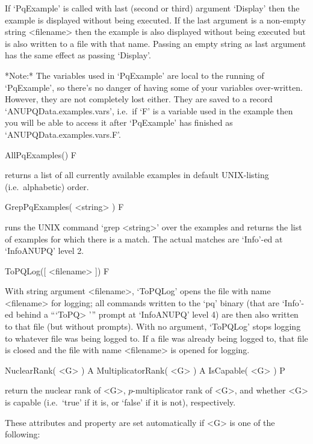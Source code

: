 If `PqExample' is called with last (second or third)  argument  `Display'
then the example  is  displayed  without  being  executed.  If  the  last
argument is a non-empty  string  <filename>  then  the  example  is  also
displayed without being executed but is also written to a file with  that
name. Passing an empty string as last argument has  the  same  effect  as
passing `Display'.

*Note:*
The  variables  used  in  `PqExample'  are  local  to  the   running   of
`PqExample', so there's no  danger  of  having  some  of  your  variables
over-written. However, they are not  completely  lost  either.  They  are
saved to a record `ANUPQData.examples.vars', i.e.~if `F'  is  a  variable
used in the example then you will be able to access it after  `PqExample'
has finished as `ANUPQData.examples.vars.F'.

\>AllPqExamples() F

returns  a  list  of  all  currently  available   examples   in   default
UNIX-listing (i.e.~alphabetic) order.

\>GrepPqExamples( <string> ) F

runs the UNIX command `grep <string>'  over  the  {\ANUPQ}  examples  and
returns the list of examples for which  there  is  a  match.  The  actual
matches are `Info'-ed at `InfoANUPQ' level 2.

\>ToPQLog([ <filename> ]) F

With string argument <filename>,  `ToPQLog'  opens  the  file  with  name
<filename> for logging; all commands written to the `pq' binary (that are
`Info'-ed behind a ```ToPQ> ''' prompt at `InfoANUPQ' level 4)  are  then
also written to that  file  (but  without  prompts).  With  no  argument,
`ToPQLog' stops logging to whatever file was being logged to. If  a  file
was already being logged to, that file is closed and the file  with  name
<filename> is opened for logging.


\>NuclearRank( <G> ) A
\>MultiplicatorRank( <G> ) A
\>IsCapable( <G> ) P

return the nuclear rank  of  <G>,  $p$-multiplicator  rank  of  <G>,  and
whether <G> is capable (i.e.~`true' if it is, or `false' if it  is  not),
respectively.

These attributes and property are set automatically if <G> is one of  the
following:

